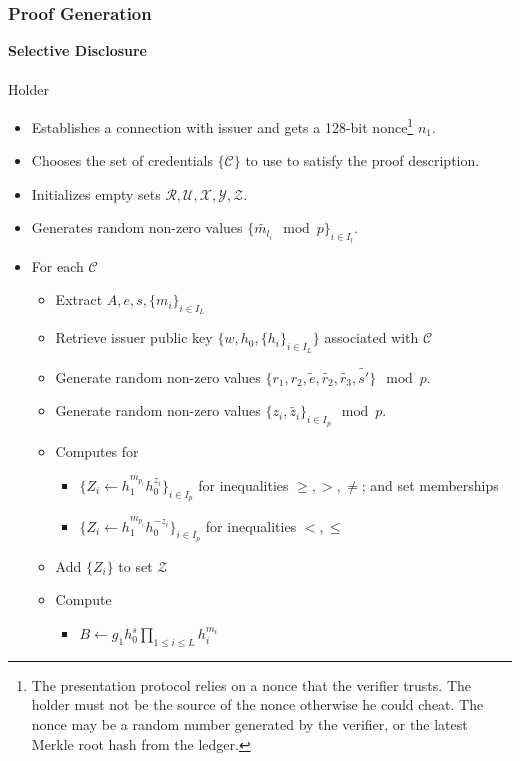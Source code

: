 \documentclass[a4paper]{article}
\begin{document}
\subsubsection{Proof Generation}
\textbf{Selective Disclosure}\\\\
Holder
\begin{itemize}
    \item Establishes a connection with issuer and gets a 128-bit nonce\footnote{The presentation protocol relies on a nonce that the verifier trusts. The holder must not be the source of the nonce otherwise he could cheat. The nonce may be a random number generated by the verifier, or the latest Merkle root hash from the ledger.} $n_1$.
    \item Chooses the set of credentials $\{\mathcal{C}\}$ to use to satisfy the proof description.
    \item Initializes empty sets $\mathcal{R}, \mathcal{U}, \mathcal{X}, \mathcal{Y}, \mathcal{Z}$.
    \item Generates random non-zero values $\{\widetilde{m_{l_i}} \mod p\}_{i \in I_l}$.
    \item For each $\mathcal{C}$
    \begin{itemize}
        \item Extract $A, e, s, \{m_i\}_{i \in I_L}$
        \item Retrieve issuer public key $\{w, h_0, \{h_i\}_{i \in I_L}\}$ associated with $\mathcal{C}$
        \item Generate random non-zero values $\{r_1,r_2,\widetilde{e},\widetilde{r_2},\widetilde{r_3},\widetilde{s'}\} \mod p$.
        \item Generate random non-zero values $\{z_i,\widetilde{z_i}\}_{i\in I_p} \mod p$.
        \item Computes for 
            \begin{itemize}
                \item $\{Z_i \leftarrow h_1^{m_{p_i}}h_0^{z_i}\}_{i\in I_p}$ for inequalities $\geq, >,  \neq$; and set memberships
                \item $\{Z_i \leftarrow h_1^{m_{p_i}}h_0^{-z_i}\}_{i\in I_p}$ for inequalities $<, \leq$
            \end{itemize}
        \item Add $\{Z_i\}$ to set $\mathcal{Z}$
        \item Compute 
            \begin{itemize}
                \item $B \leftarrow g_1  h_0^{s}\prod_{1\leq i\leq L} h_i^{m_i}$

\end{itemize}
\end{itemize}
\end{itemize}
\end{document}
